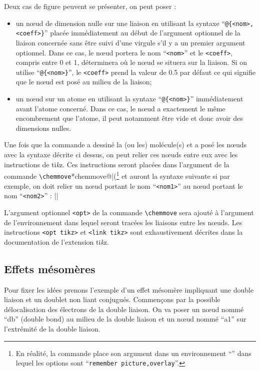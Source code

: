 \documentclass[10pt]{article}
\makeatletter
\newcommand\idx{\@ifstar{\let\print@or@not\@gobble\idx@}{\let\print@or@not\@firstofone\idx@}}
\newcommand\idx@[1]{%
	\ifcat\expandafter\noexpand\@car#1\@nil\relax%
		\expandafter\ifx\@car#1\@nil\protect
			\index{#1}%
			\print@or@not{#1}%
		\else
			\saveexpandmode\expandarg
			\StrSubstitute{\string#1}{\string @}{\@empty\protect\symbol{'100}}[\temp@]%
			\StrGobbleLeft\temp@1[\temp@]%
			\restoreexpandmode
			\expandafter\index\expandafter{\temp@ @\protect\texttt{\protect\textbackslash\temp@}}%
			\print@or@not{\texttt{\string#1}}%
		\fi
	\else
		\index{#1}%
		\print@or@not{#1}%
	\fi
}
\newcommand\TIKZ{ti\textit kz\xspace}
\makeatother
\begin{document}
Deux cas de figure peuvent se présenter, on peut poser :
\begin{itemize}
	\item un nœud de dimension nulle sur une liaison en utilisant la syntaxe ``\verb-@{<nom>,<coeff>}-'' placée immédiatement au début de l'argument optionnel de la liaison concernée sans être suivi d'une virgule s'il y a un premier argument optionnel. Dans ce cas, le nœud portera le nom ``\verb-<nom>-'' et le \verb-<coeff>-, compris entre 0 et 1, déterminera où le nœud se situera sur la liaison. Si on utilise ``\verb-@{<nom>}-'', le \verb-<coeff>- prend la valeur de 0.5 par défaut ce qui signifie que le nœud est posé au milieu de la liaison;
	\item un nœud sur un atome en utilisant la syntaxe ``\verb-@{<nom>}-'' immédiatement avant l'atome concerné. Dans ce cas, le nœud a exactement le même encombrement que l'atome, il peut notamment être vide et donc avoir des dimensions nulles.
\end{itemize}
Une fois que la commande \idx{\chemfig} a dessiné la (ou les) molécule(s) et a posé les nœuds avec la syntaxe décrite ci dessus, on peut relier ces nœuds entre eux avec les instructions de \TIKZ. Ces instructions seront placées dans l'argument de la commande \verb-\chemmove-\idx*{chemmove@\protect\texttt{\protect\string\protect\chemmove}|(}\footnote{En réalité, la commande \texttt{\string\chemmove} place son argument dans un environnement ``\idx{tikzpicture}'' dans lequel les options sont ``\texttt{remember picture,overlay}''.} et auront la syntaxe suivante si par exemple, on doit relier un nœud portant le nom ``\verb-<nom1>-'' au nœud portant le nom ``\verb-<nom2>-'' :
\centerverb||
\smallskip

L'argument optionnel \verb-<opt>- de la commande \verb-\chemmove- sera ajouté à l'argument de l'environnement \idx{tikzpicture} dans lequel seront tracées les liaisons entre les nœuds. Les instructions \verb-<opt tikz>- et \verb-<link tikz>- sont exhaustivement décrites dans la documentation de l'extension \TIKZ.

\subsection{Effets mésomères}
Pour fixer les idées prenons l'exemple d'un effet mésomère impliquant une double liaison et un doublet non liant conjugués. Commençons par la possible délocalisation des électrons de la double liaison. On va poser un nœud nommé ``db'' (double bond) au milieu de la double liaison et un nœud nommé ``a1'' sur l'extrémité de la double liaison.
\end{document}
